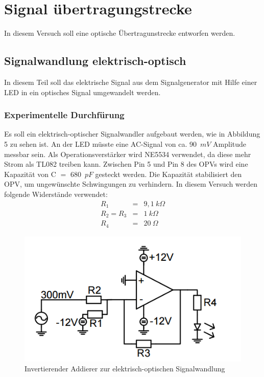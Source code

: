 \section{Signal \"ubertragungstrecke}
In diesem Versuch soll eine optische \"Ubertragunstrecke entworfen werden.
\subsection{Signalwandlung elektrisch-optisch}
In diesem Teil soll das elektrische Signal aus dem Signalgenerator mit Hilfe einer LED in ein optisches Signal umgewandelt werden.
\subsubsection{Experimentelle Durchf\"urung}
Es soll ein elektrisch-optischer Signalwandler aufgebaut werden, wie in Abbildung 5 zu sehen ist. An der LED m\"usste eine AC-Signal von ca. 90~$mV$ Amplitude messbar sein. Als Operationsverst\"arker wird NE5534 verwendet, da diese mehr Strom als TL082 treiben kann. Zwischen Pin 5 und Pin 8 des OPVs wird eine Kapazit\"at von C $=$ 680~$pF$ gesteckt werden. Die Kapazit\"at stabilisiert den OPV, um ungew\"unschte Schwingungen zu verhindern. In diesem Versuch werden folgende Widerst\"ande verwendet: 
\begin{eqnarray*}
R_1 &=& 9,1~k\Omega \\
R_2 = R_3 &=& 1~k\Omega \\
R_4 &=& 20~\Omega
\end{eqnarray*}
\begin{figure}[!h]
\begin{center}
\includegraphics[scale=0.7]{bild/Signalwandler}
\caption{Invertierender Addierer zur elektrisch-optischen Signalwandlung}
\end{center}
\end{figure}
